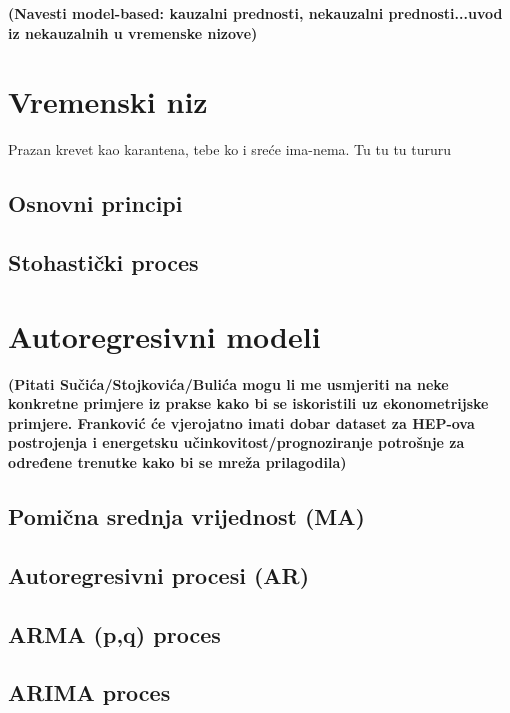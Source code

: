 \documentclass[a4paper,12pt,oneside]{memoir}
\begin{document}
            

            \textbf{(Navesti model-based: kauzalni prednosti, nekauzalni prednosti...uvod iz nekauzalnih u vremenske nizove)}

    \chapter{Vremenski niz}

        Prazan krevet kao karantena, tebe ko i sreće ima-nema. Tu tu tu tururu

        \section{Osnovni principi}
        \section{Stohastički proces}
    \chapter{Autoregresivni modeli}
        \textbf{(Pitati Sučića/Stojkovića/Bulića mogu li me usmjeriti na neke konkretne primjere iz prakse kako bi se iskoristili uz ekonometrijske primjere. Franković će vjerojatno imati dobar dataset za HEP-ova postrojenja i energetsku učinkovitost/prognoziranje potrošnje za određene trenutke kako bi se mreža prilagodila)}
        \section{Pomična srednja vrijednost (MA)}
        \section{Autoregresivni procesi (AR)}
        \section{ARMA (p,q) proces}
        \section{ARIMA proces}
\end{document}
